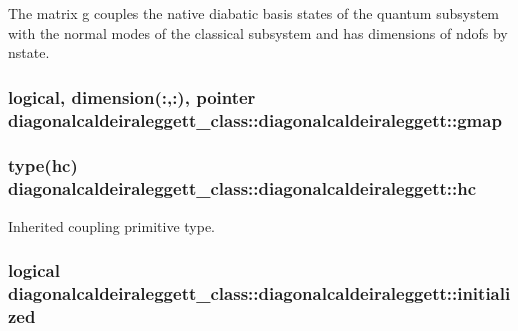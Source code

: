 The matrix g couples the native diabatic basis states of the quantum subsystem with the normal modes of the classical subsystem and has dimensions of ndofs by nstate. \hypertarget{structdiagonalcaldeiraleggett__class_1_1diagonalcaldeiraleggett_a4f11e78baf84d1f5a25a9aa3e48a7c01}{
\subsubsection[{gmap}]{\setlength{\rightskip}{0pt plus 5cm}logical, dimension(\+:,\+:), pointer diagonalcaldeiraleggett\+\_\+class\+::diagonalcaldeiraleggett\+::gmap\hspace{0.3cm}{\ttfamily [private]}}}\label{structdiagonalcaldeiraleggett__class_1_1diagonalcaldeiraleggett_a4f11e78baf84d1f5a25a9aa3e48a7c01}
\hypertarget{structdiagonalcaldeiraleggett__class_1_1diagonalcaldeiraleggett_ac3c92c8b85d575c978c65148bd3a85b0}{
\subsubsection[{hc}]{\setlength{\rightskip}{0pt plus 5cm}type(hc) diagonalcaldeiraleggett\+\_\+class\+::diagonalcaldeiraleggett\+::hc\hspace{0.3cm}{\ttfamily [private]}}}\label{structdiagonalcaldeiraleggett__class_1_1diagonalcaldeiraleggett_ac3c92c8b85d575c978c65148bd3a85b0}


Inherited coupling primitive type. 

\hypertarget{structdiagonalcaldeiraleggett__class_1_1diagonalcaldeiraleggett_a2d82d59f44c03c02828f6e8a98143d10}{
\subsubsection[{initialized}]{\setlength{\rightskip}{0pt plus 5cm}logical diagonalcaldeiraleggett\+\_\+class\+::diagonalcaldeiraleggett\+::initialized\hspace{0.3cm}{\ttfamily [private]}}}\label{structdiagonalcaldeiraleggett__class_1_1diagonalcaldeiraleggett_a2d82d59f44c03c02828f6e8a98143d10}


